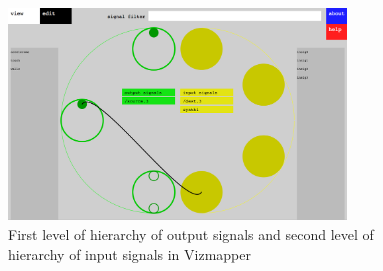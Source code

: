 \begin{figure}[ht]
\centering
\includegraphics[width=0.8\textwidth]{right_second_level.png}
\caption{First level of hierarchy of output signals and second level of hierarchy of input signals in Vizmapper}
\label{fig:firstLevel}
\end{figure}
